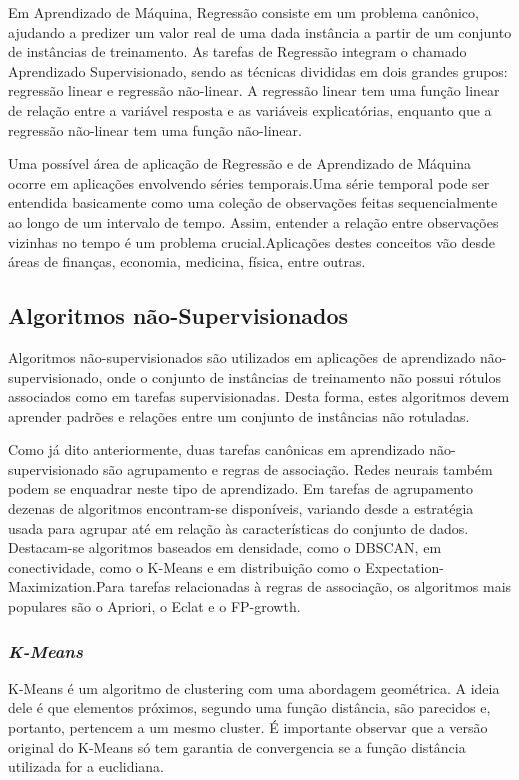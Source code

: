 \documentclass{article}
\begin{document}
Em Aprendizado de Máquina, Regressão consiste em um problema canônico, ajudando a predizer um valor real de uma dada instância a partir de um conjunto de instâncias de treinamento. As tarefas de Regressão integram o chamado Aprendizado Supervisionado, sendo as técnicas divididas em dois grandes grupos: regressão linear e regressão não-linear. A regressão linear tem uma função linear de relação entre a variável resposta e as variáveis explicatórias, enquanto que a regressão não-linear tem uma função não-linear.

Uma possível área de aplicação de Regressão e de Aprendizado de Máquina ocorre em aplicações envolvendo séries temporais.Uma série temporal pode ser entendida basicamente como uma coleção de observações feitas sequencialmente ao longo de um intervalo de tempo. Assim, entender a relação entre observações vizinhas no tempo é um problema crucial.Aplicações destes conceitos vão desde áreas de finanças, economia, medicina, física, entre outras.

\subsection{Algoritmos não-Supervisionados}

Algoritmos não-supervisionados são utilizados em aplicações de aprendizado não-supervisionado, onde o conjunto de instâncias de treinamento não possui rótulos associados como em tarefas supervisionadas. Desta forma, estes algoritmos devem aprender padrões e relações entre um conjunto de instâncias não rotuladas.

Como já dito anteriormente, duas tarefas canônicas em aprendizado não-supervisionado são agrupamento e regras de associação. Redes neurais também podem se enquadrar neste tipo de aprendizado. Em tarefas de agrupamento dezenas de algoritmos encontram-se disponíveis, variando desde a estratégia usada para agrupar até em relação às características do conjunto de dados. Destacam-se algoritmos baseados em densidade, como o DBSCAN, em conectividade, como o K-Means e em distribuição como o Expectation-Maximization.Para tarefas relacionadas à regras de associação, os algoritmos mais populares são o Apriori, o Eclat e o FP-growth.  

\subsubsection{{\b \it K-Means}}
K-Means é um algoritmo de clustering com uma abordagem geométrica.
A ideia dele é que elementos próximos, segundo uma função distância, são parecidos e, portanto, pertencem a um mesmo cluster.
É importante observar que a versão original do K-Means só tem garantia de convergencia se a função distância utilizada for a euclidiana.
\end{document}
